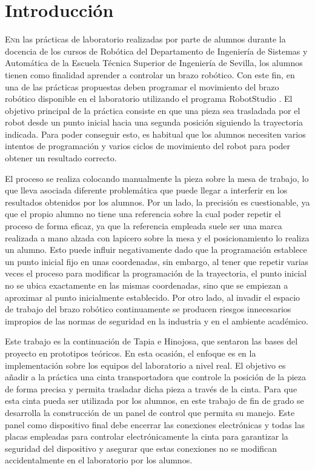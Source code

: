 \chapter{Introducción}\label{chp-01}


\lettrine[lraise=-0.1, lines=2, loversize=0.2]{E}{n}n las prácticas de laboratorio realizadas por parte de alumnos durante la docencia de los cursos de Robótica del Departamento de Ingeniería de Sistemas y Automática de la Escuela Técnica Superior de Ingeniería de Sevilla, los alumnos tienen como finalidad aprender a controlar un brazo robótico. Con este fin, en una de las prácticas propuestas deben programar el movimiento del brazo robótico disponible en el laboratorio utilizando el programa RobotStudio . El objetivo principal de la práctica consiste en que una pieza sea trasladada por el robot desde un punto inicial hacia una segunda posición siguiendo la trayectoria indicada. Para poder conseguir esto, es habitual que los alumnos necesiten varios intentos de programación y varios ciclos de movimiento del robot para poder obtener un resultado correcto.

El proceso se realiza colocando manualmente la pieza sobre la mesa de trabajo, lo que lleva asociada diferente problemática que puede llegar a interferir en los resultados obtenidos por los alumnos. Por un lado, la precisión es cuestionable, ya que el propio alumno no tiene una referencia sobre la cual poder repetir el proceso de forma eficaz, ya que la referencia empleada suele ser una marca realizada a mano alzada con lapicero sobre la mesa y el posicionamiento lo realiza un alumno. Esto puede influir negativamente dado que la programación establece un punto inicial fijo en unas coordenadas, sin embargo, al tener que repetir varias veces el proceso para modificar la programación de la trayectoria, el punto inicial no se ubica exactamente en las mismas coordenadas, sino que se empiezan a aproximar al punto inicialmente establecido. Por otro lado, al invadir el espacio de trabajo del brazo robótico continuamente se producen riesgos innecesarios impropios de las normas de seguridad en la industria y en el ambiente académico.

Este trabajo es la continuación de Tapia\cite{tapia} e Hinojosa\cite{rea}, que sentaron las bases del proyecto en prototipos teóricos. En esta ocasión, el enfoque es en la implementación sobre los equipos del laboratorio a nivel real. El objetivo es añadir a la práctica una cinta transportadora que controle la posición de la pieza de forma precisa y permita trasladar dicha pieza a través de la cinta. Para que esta cinta pueda ser utilizada por los alumnos, en este trabajo de fin de grado se desarrolla la construcción de un panel de control que permita su manejo. Este panel como dispositivo final debe encerrar las conexiones electrónicas y todas las placas empleadas para controlar electrónicamente la cinta para garantizar la seguridad del dispositivo y asegurar que estas conexiones no se modifican accidentalmente en el laboratorio por los alumnos.


